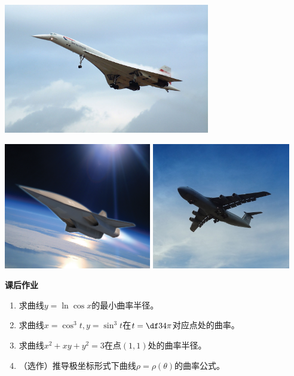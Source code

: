 \begin{center}
	\includegraphics[width=9cm]{./images/ch3/AP-1.jpg}
	
	\bigskip
	
	\includegraphics[height=5.5cm]{./images/ch3/AP-2.jpg}\quad
	\includegraphics[height=5.5cm]{./images/ch3/AP-3.jpg}
	
\end{center}

\begin{ext}
	{\bf 课后作业}
	
	\begin{enumerate}
	  \item 求曲线$y=\ln\cos x$的最小曲率半径。
	  \item 求曲线$x=\cos^3t,y=\sin^3t$在$t=\df34\pi$对应点处的曲率。
	  \item 求曲线$x^2+xy+y^2=3$在点$(1,1)$处的曲率半径。
	  \item （选作）推导极坐标形式下曲线$\rho=\rho(\theta)$的曲率公式。
	\end{enumerate}
\end{ext}

